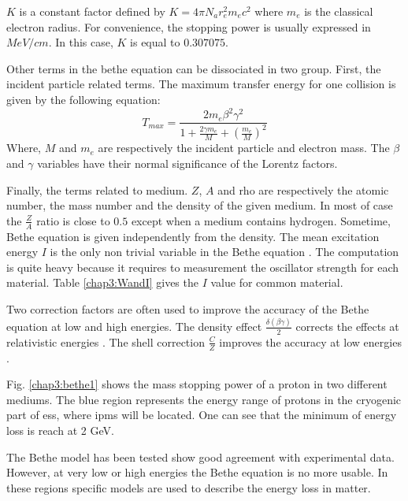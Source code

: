 \begin{refsection}
	\(K\) is a constant factor defined by \(K=4 \pi N_{a} r_{e}^{2} m_{e} c^{2}\) where \(m_{e}\) is the classical electron radius. For convenience, the stopping power is usually expressed in \(MeV/cm\). In this case, \(K\) is equal to \(0.307075\).

	Other terms in the bethe equation can be dissociated in two group. First, the incident particle related terms. The maximum transfer energy for one collision is given by the following equation:
	\begin{equation}
		T_{max} = \frac{2 m_{e} \beta^{2} \gamma^{2}}{1 + \frac{2 \gamma m_{e} }{M} + \left( \frac{m_{e}}{M} \right)^{2}}
	\end{equation}
	Where, \(M\) and \(m_{e}\) are respectively the incident particle and electron mass. The \(\beta\) and \(\gamma\) variables have their normal significance of the Lorentz factors.

	Finally, the terms related to medium. \(Z\), \(A\) and rho are respectively the atomic number, the mass number and the density of the given medium. In most of case the \(\frac{Z}{A}\) ratio is close to \(0.5\) except when a medium contains hydrogen. Sometime, Bethe equation is given independently from the density.
	The mean excitation energy \(I\) is the only non trivial variable in the Bethe equation \cite{Berger1984,Berger1993}. The computation is quite heavy because it requires to measurement  the oscillator strength for each material. Table \ref{chap3:WandI} gives the \(I\) value for common material.

	Two correction factors are often used to improve the accuracy of the Bethe equation at low and high energies. The density effect \(\frac{\delta(\beta \gamma)}{2}\) corrects the effects at relativistic energies \cite{Sternheimer1984}. The shell correction \(\frac{C}{Z}\) improves the accuracy at low energies \cite{Bichsel2002}.

	

	Fig. \ref{chap3:bethe1} shows the mass stopping power of a proton in two different mediums. The blue region represents the energy range of protons in the cryogenic part of \acrshort{ess}, where \acrshort{ipm}s will be located. One can see that the minimum of energy loss is reach at 2 GeV.

	The Bethe model has been tested show good agreement with experimental data. However, at very low or high energies the Bethe equation is no more usable. In these regions specific models are used to describe the energy loss in matter.


\end{refsection}
